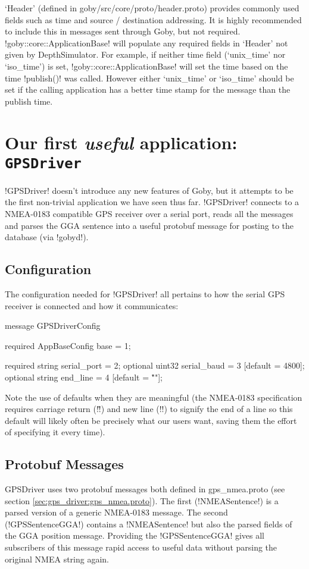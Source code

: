 `Header' (defined in goby/src/core/proto/header.proto) provides commonly used fields such as time and source / destination addressing. It is highly recommended to include this in messages sent through Goby, but not required. !goby::core::ApplicationBase! will populate any required fields in `Header' not given by DepthSimulator. For example, if neither time field (`unix\_time' nor `iso\_time') is set, !goby::core::ApplicationBase! will set the time based on the time !publish()! was called. However either `unix\_time' or `iso\_time' should be set if the calling application has a better time stamp for the message than the publish time.

\section{Our first \textit{useful} application: \texttt{GPSDriver}}

!GPSDriver! doesn't introduce any new features of Goby, but it attempts to be the first non-trivial application we have seen thus far. !GPSDriver! connects to a NMEA-0183 compatible GPS receiver over a serial port, reads all the messages and parses the GGA sentence into a useful protobuf message for posting to the database (via !gobyd!). 

\subsection{Configuration}
The configuration needed for !GPSDriver! all pertains to how the serial GPS receiver is connected and how it communicates:
\begin{boxedverbatim}
message GPSDriverConfig
{
  required AppBaseConfig base = 1;

  required string serial_port = 2;
  optional uint32 serial_baud = 3 [default = 4800];
  optional string end_line = 4 [default = "\r\n"];
}
\end{boxedverbatim}
\resetbvlinenumber

Note the use of defaults when they are meaningful (the NMEA-0183 specification requires carriage return (!\r!) and new line (!\n!) to signify the end of a line so this default will likely often be precisely what our users want, saving them the effort of specifying it every time).

\subsection{Protobuf Messages}
GPSDriver uses two \gls{protobuf} messages both defined in gps\_nmea.proto (see section \ref{sec:gps_driver:gps_nmea.proto}). The first (!NMEASentence!) is a parsed version of a generic NMEA-0183 message. The second (!GPSSentenceGGA!) contains a !NMEASentence! but also the parsed fields of the GGA position message. Providing the !GPSSentenceGGA! gives all subscribers of this message rapid access to useful data without parsing the original NMEA string again.

